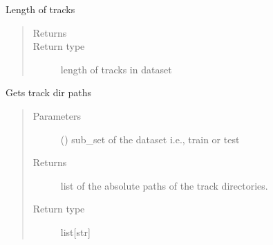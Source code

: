 \documentclass[letterpaper,10pt,english,openany,oneside]{sphinxmanual}
\begin{document}
\begin{fulllineitems}
\begin{fulllineitems}
\begin{quote}
\begin{description}
\begin{itemize}
\end{itemize}

\end{description}\end{quote}

\end{fulllineitems}


\begin{fulllineitems}
\label{\detokenize{docs/source/dataset:dataset.Dataset.__len__}}
Length of tracks
\begin{quote}\begin{description}
\item[{Returns}] \leavevmode
{}

\item[{Return type}] \leavevmode
length of tracks in dataset

\end{description}\end{quote}

\end{fulllineitems}


\begin{fulllineitems}
\label{\detokenize{docs/source/dataset:dataset.Dataset.get_track_dir_paths}}
Gets track dir paths
\begin{quote}\begin{description}
\item[{Parameters}] \leavevmode
{} () \textendash{} sub\_set of the dataset i.e., train or test

\item[{Returns}] \leavevmode
list of the absolute paths of the track directories.

\item[{Return type}] \leavevmode
list{[}str{]}

\end{description}\end{quote}


\end{fulllineitems}
\end{fulllineitems}
\end{document}
